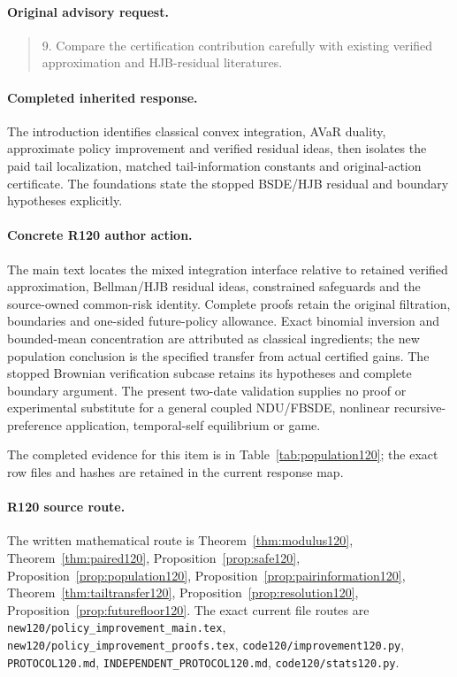 \paragraph{Original advisory request.}
\begin{quote}
9. Compare the certification contribution carefully with existing verified approximation and HJB-residual literatures.
\end{quote}
\paragraph{Completed inherited response.}
The introduction identifies classical convex integration, AVaR duality, approximate policy improvement and verified residual ideas, then isolates the paid tail localization, matched tail-information constants and original-action certificate. The foundations state the stopped BSDE/HJB residual and boundary hypotheses explicitly.
\paragraph{Concrete R120 author action.}
The main text locates the mixed integration interface relative to retained verified approximation, Bellman/HJB residual ideas, constrained safeguards and the source-owned common-risk identity. Complete proofs retain the original filtration, boundaries and one-sided future-policy allowance. Exact binomial inversion and bounded-mean concentration are attributed as classical ingredients; the new population conclusion is the specified transfer from actual certified gains. The stopped Brownian verification subcase retains its hypotheses and complete boundary argument. The present two-date validation supplies no proof or experimental substitute for a general coupled NDU/FBSDE, nonlinear recursive-preference application, temporal-self equilibrium or game.

The completed evidence for this item is in Table~\ref{tab:population120}; the exact row files and hashes are retained in the current response map.
\paragraph{R120 source route.}
The written mathematical route is Theorem~\ref{thm:modulus120}, Theorem~\ref{thm:paired120}, Proposition~\ref{prop:safe120}, Proposition~\ref{prop:population120}, Proposition~\ref{prop:pairinformation120}, Theorem~\ref{thm:tailtransfer120}, Proposition~\ref{prop:resolution120}, Proposition~\ref{prop:futurefloor120}. The exact current file routes are \nolinkurl{new120/policy_improvement_main.tex}, \nolinkurl{new120/policy_improvement_proofs.tex}, \nolinkurl{code120/improvement120.py}, \nolinkurl{PROTOCOL120.md}, \nolinkurl{INDEPENDENT_PROTOCOL120.md}, \nolinkurl{code120/stats120.py}.
